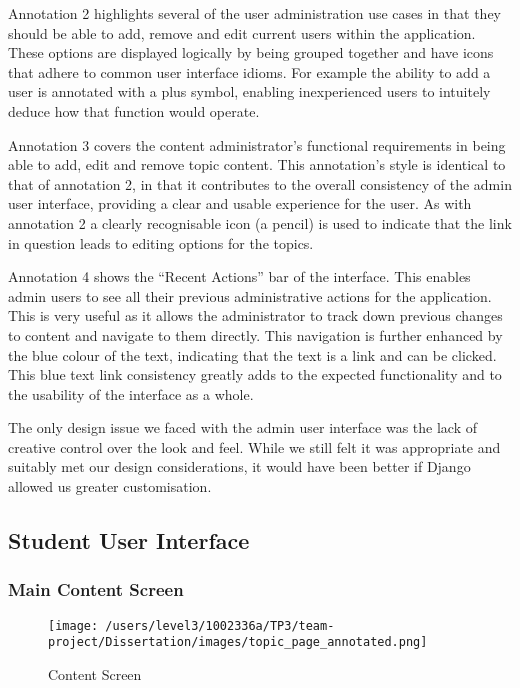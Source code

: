 \documentclass{l3proj}
\begin{document}
Annotation 2 highlights several of the user administration use cases in that they should be able to add, remove and edit current users within the application. These options are displayed logically by being grouped together and have icons that adhere to common user interface idioms. For example the ability to add a user is annotated with a plus symbol, enabling inexperienced users to intuitely deduce how that function would operate. 

Annotation 3 covers the content administrator's functional requirements in being able to add, edit and remove topic content. This annotation's style is identical to that of annotation 2, in that it contributes to the overall consistency of the admin user interface, providing a clear and usable experience for the user. As with annotation 2 a clearly recognisable icon (a pencil) is used to indicate that the link in question leads to editing options for the topics. 

Annotation 4 shows the ``Recent Actions'' bar of the interface. This enables admin users to see all their previous administrative actions for the application. This is very useful as it allows the administrator to track down previous changes to content and navigate to them directly. This navigation is further enhanced by the blue colour of the text, indicating that the text is a link and can be clicked. This blue text link consistency greatly adds to the expected functionality and to the usability of the interface as a whole.

The only design issue we faced with the admin user interface was the lack of creative control over the look and feel. While we still felt it was appropriate and suitably met our design considerations, it would have been better if Django allowed us greater customisation.

\subsection{Student User Interface}

\subsubsection{Main Content Screen}

\begin{figure}[!htb]
\caption{Content Screen}
\texttt{[image: /users/level3/1002336a/TP3/team-project/Dissertation/images/topic\_page\_annotated.png]}
\end{figure}
\end{document}
